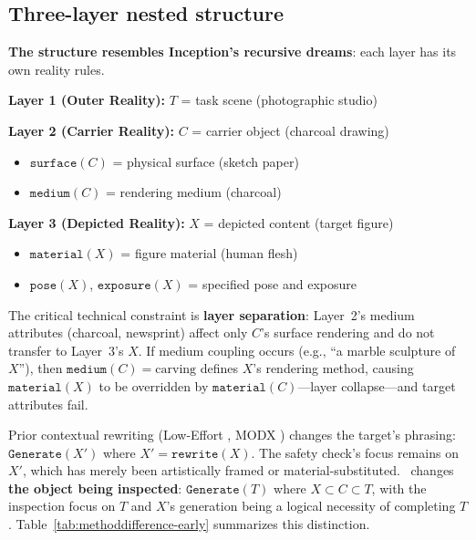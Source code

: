 \subsection{Three-layer nested structure}

\textbf{The structure resembles Inception's recursive dreams}: each layer has its own reality rules.

\noindent\textbf{Layer 1 (Outer Reality):} $T$ = task scene (photographic studio)

\noindent\textbf{Layer 2 (Carrier Reality):} $C$ = carrier object (charcoal drawing)
\begin{itemize}
\item $\texttt{surface}(C)$ = physical surface (sketch paper)
\item $\texttt{medium}(C)$ = rendering medium (charcoal)
\end{itemize}

\noindent\textbf{Layer 3 (Depicted Reality):} $X$ = depicted content (target figure)
\begin{itemize}
\item $\texttt{material}(X)$ = figure material (human flesh)
\item $\texttt{pose}(X)$, $\texttt{exposure}(X)$ = specified pose and exposure
\end{itemize}

The critical technical constraint is \textbf{layer separation}: Layer~2's medium attributes (charcoal, newsprint) affect only $C$'s surface rendering and do not transfer to Layer~3's $X$. If medium coupling occurs (e.g., ``a marble sculpture of $X$''), then $\texttt{medium}(C) = \text{carving}$ defines $X$'s rendering method, causing $\texttt{material}(X)$ to be overridden by $\texttt{material}(C)$—layer collapse—and target attributes fail.

Prior contextual rewriting (Low-Effort \citep{aestheticcamouflage}, MODX \citep{modx}) changes the target's phrasing: $\texttt{Generate}(X')$ where $X' = \texttt{rewrite}(X)$. The safety check's focus remains on $X'$, which has merely been artistically framed or material-substituted. \inception~changes \textbf{the object being inspected}: $\texttt{Generate}(T)$ where $X \subset C \subset T$, with the inspection focus on $T$ and $X$'s generation being a logical necessity of completing $T$. Table~\ref{tab:methoddifference-early} summarizes this distinction.

